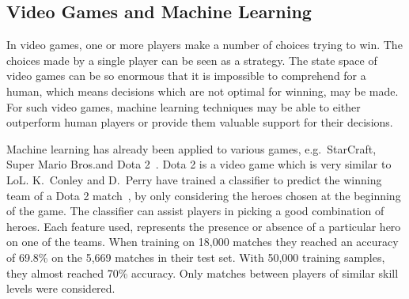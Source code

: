 \subsection{Video Games and Machine Learning}\label{sec:mlandonlinevideogames}
In video games, one or more players make a number of choices trying to win. The choices made by a single player can be seen as a strategy.
The state space of video games can be so enormous that it is impossible to comprehend for a human, which means decisions which are not optimal for winning, may be made.
For such video games, machine learning techniques may be able to either outperform human players or provide them valuable support for their decisions.

Machine learning has already been applied to various games, e.g.\ StarCraft, Super Mario Bros.\@ and Dota 2~\cite{Park:2012:PES:2425296.2425298,supermario,dota2article}. %
Dota 2 is a video game which is very similar to LoL.\@ 
K.\ Conley and D.\ Perry have trained a classifier to predict the winning team of a Dota 2 match~\cite{dota2article}, by only considering the heroes chosen at the beginning of the game. The classifier can assist players in picking a good combination of heroes.
Each feature used, represents the presence or absence of a particular hero on one of the teams.
When training on 18,000 matches they reached an accuracy of 69.8\% on the 5,669 matches in their test set.
With 50,000 training samples, they almost reached 70\% accuracy. Only matches between players of similar skill levels were considered.

%
%



